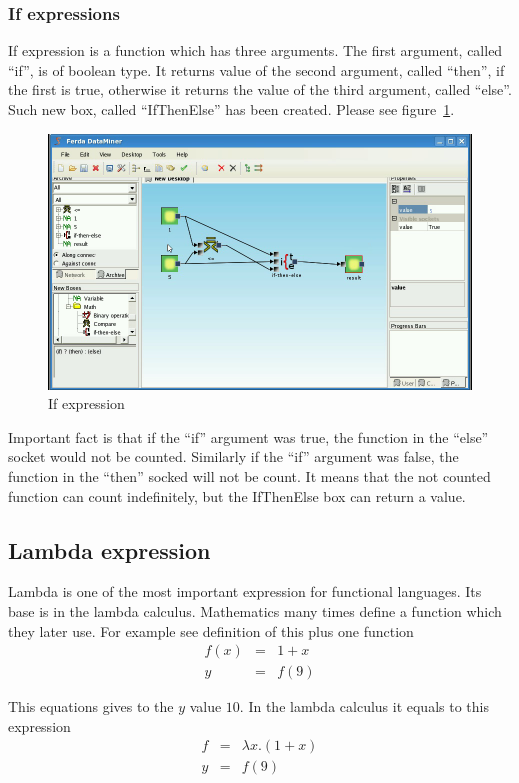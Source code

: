 \documentclass[a4paper,12pt]{book}
\begin{document}
\subsubsection{If expressions}
If expression is a function which has three arguments. The first argument, called ``if'', is of boolean type. It returns value of the second argument, called ``then'', if the first is true, otherwise it returns the value of the third argument, called ``else''. Such new box, called ``IfThenElse'' has been created. Please see figure~\ref{fig:boxIfThenElse}.
\begin{figure}
\includegraphics[width=1\textwidth]{ifthenelse2.png}
	\caption{If expression}
	\label{fig:boxIfThenElse}
\end{figure}

Important fact is that if the ``if'' argument was true, the function in the ``else'' socket would not be counted. Similarly if the ``if'' argument was false, the function in the ``then'' socked will not be count. It means that the not counted function can count indefinitely, but the IfThenElse box can return a value.

\subsection{Lambda expression}
Lambda is one of the most important expression for functional languages. Its base is in the lambda calculus. Mathematics many times define a function which they later use. For example see definition of this plus one function
\begin{eqnarray*}
f(x)&=&1 + x\\
y&=&f(9)
\end{eqnarray*}

This equations gives to the $y$ value $10$. In the lambda calculus it equals to this expression
\begin{eqnarray*}
f&=&\lambda x.(1+x)\\
y&=&f(9)
\end{eqnarray*}
\end{document}

